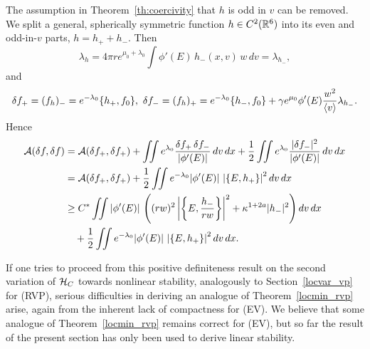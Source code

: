 \documentclass[11pt]{article}
\begin{document}
The assumption in Theorem~\ref{th:coercivity} that $h$ is odd in $v$
can be removed.
We split a general, spherically symmetric function $h\in C^2(\mathbb R^6)$
into its even and odd-in-$v$ parts, $h=h_+ + h_-$. Then 
\[
\lambda_h=4\pi r e^{\mu_0+\lambda_0}
\int \phi'(E)\,h_-(x,v)\,w\,dv = \lambda_{h_-},
\]
and
\[
\delta f_+ = (f_h)_- =
e^{-\lambda_0}\{h_+,f_0\},\
\delta f_- = (f_h)_+ =
e^{-\lambda_0}\{h_-,f_0\} + 
\gamma e^{\mu_0} \phi'(E) \frac{w^2}{\left\langle v\right\rangle} \lambda_{h_-}.
\]
Hence
\begin{align}\label{gen_coercivity}
  {\cal A} (\delta f,\delta f)
  &=
  {\cal A} (\delta f_+,\delta f_+) + 
  \iint e^{\lambda_0}\frac{\delta f_+ \, \delta f_-}{|\phi'(E)|}\,dv\,dx
  + \frac{1}{2}
  \iint e^{\lambda_0}\frac{|\delta f_-|^2}{|\phi'(E)|}\,dv\,dx\notag\\
  &=
  {\cal A} (\delta f_+,\delta f_+) +
  \frac{1}{2}
  \iint e^{-\lambda_0} |\phi'(E)|\, \left|\{E,h_+\}\right|^2 dv\,dx\notag\\
  &\geq
  C^\ast\iint|\phi'(E)|\,\left((rw)^2 
  \left|\left\{E,\frac{h_-}{rw}\right\}\right|^2 
  + \kappa^{1+2a} |h_-|^2\right) dv\,dx\notag\\
  &\quad {}+
  \frac{1}{2}
  \iint e^{-\lambda_0} |\phi'(E)|\, \left|\{E,h_+\}\right|^2dv\,dx.
\end{align}

If one tries to proceed from this positive definiteness result on
the second variation of ${\cal H}_C$ towards nonlinear stability,
analogously to Section~\ref{locvar_vp} for (RVP), serious difficulties
in deriving an analogue of Theorem~\ref{locmin_rvp} arise,
again from the inherent lack of compactness for (EV).
We believe that some analogue of Theorem~\ref{locmin_rvp} remains correct for
(EV), but so far the result of the present section has only been used to
derive linear stability.
%
%
\end{document}
